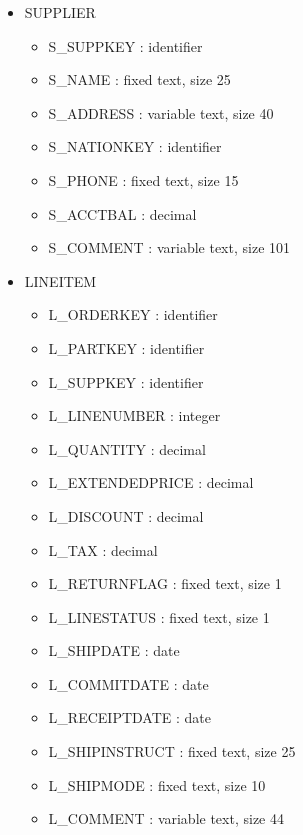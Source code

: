\begin{itemize}
  \item SUPPLIER
  \begin{itemize}
    \item S\_SUPPKEY : identifier
    \item S\_NAME : fixed text, size 25
    \item S\_ADDRESS : variable text, size 40
    \item S\_NATIONKEY : identifier
    \item S\_PHONE : fixed text, size 15
    \item S\_ACCTBAL : decimal
    \item S\_COMMENT : variable text, size 101
  \end{itemize}
  \item LINEITEM
  \begin{itemize}
    \item L\_ORDERKEY : identifier
    \item L\_PARTKEY : identifier
    \item L\_SUPPKEY : identifier
    \item L\_LINENUMBER : integer
    \item L\_QUANTITY : decimal
    \item L\_EXTENDEDPRICE : decimal
    \item L\_DISCOUNT : decimal
    \item L\_TAX : decimal
    \item L\_RETURNFLAG : fixed text, size 1
    \item L\_LINESTATUS : fixed text, size 1
    \item L\_SHIPDATE : date
    \item L\_COMMITDATE : date
    \item L\_RECEIPTDATE : date
    \item L\_SHIPINSTRUCT : fixed text, size 25
    \item L\_SHIPMODE : fixed text, size 10
    \item L\_COMMENT : variable text, size 44
  \end{itemize} 
\end{itemize}

